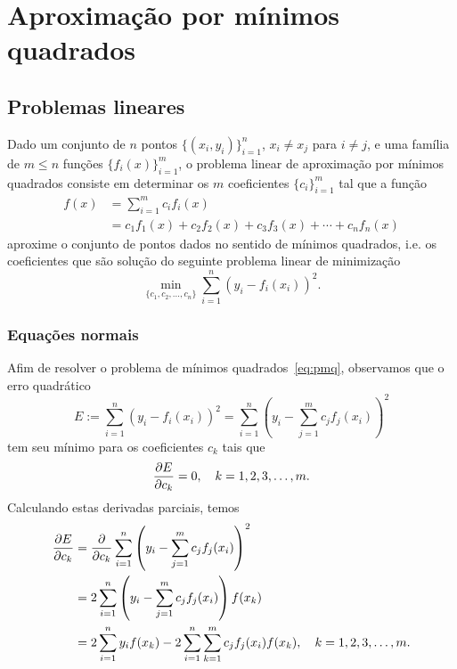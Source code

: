
\chapter{Aproximação por mínimos quadrados}\label{cap:ajuste}
\thispagestyle{fancy}

\section{Problemas lineares}\label{sec:problemas_lineares}

Dado um conjunto de $n$ pontos $\{(x_i,y_i)\}_{i=1}^n$, $x_i\neq x_j$ para $i\neq j$, e uma família de $m \leq n$ funções $\{f_i(x)\}_{i=1}^m$, o problema linear de aproximação por mínimos quadrados consiste em determinar os $m$ coeficientes $\{c_i\}_{i=1}^m$ tal que a função
\begin{equation}
  \begin{split}
    f(x) &= \sum_{i=1}^m c_if_i(x) \\
    &= c_1f_1(x) + c_2f_2(x) + c_3f_3(x) + \cdots + c_nf_n(x)
  \end{split}
\end{equation}
aproxime o conjunto de pontos dados no sentido de mínimos quadrados, i.e. os coeficientes que são solução do seguinte problema linear de minimização
\begin{equation}\label{eq:pmq}
  \min_{\{c_1,c_2,\dotsc,c_n\}} \sum_{i=1}^n (y_i - f_i(x_i))^2.
\end{equation}

\subsection{Equações normais}

Afim de resolver o problema de mínimos quadrados~\eqref{eq:pmq}, observamos que o erro quadrático
\begin{equation}
  E := \sum_{i=1}^n (y_i - f_i(x_i))^2 = \sum_{i=1}^n \left(y_i - \sum_{j=1}^m c_jf_j(x_i)\right)^2
\end{equation}
tem seu mínimo para os coeficientes $c_k$ tais que
\begin{equation}\label{eq:aux1_mq}
  \frac{\partial E}{\partial c_k} = 0,\quad k=1, 2, 3, \dotsc, m.
\end{equation}
Calculando estas derivadas parciais, temos
\begin{equation}
  \begin{split}
    \frac{\partial E}{\partial c_k} &= \frac{\partial}{\partial c_k} \sum_{i=1}^n \left(y_i - \sum_{j=1}^m c_jf_j(x_i)\right)^2\\
    &= 2\sum_{i=1}^n \left(y_i - \sum_{j=1}^m c_jf_j(x_i)\right)f(x_k)\\
    &= 2\sum_{i=1}^n y_if(x_k) - 2\sum_{i=1}^n\sum_{k=1}^m c_jf_j(x_i)f(x_k),\quad k=1, 2, 3, \dotsc, m.
  \end{split}
\end{equation}

